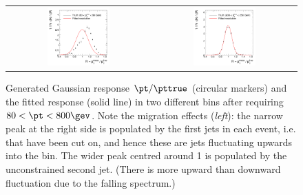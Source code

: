 \begin{figure}[ht]
  \centering
  \begin{tabular}{cc}
    \includegraphics[width=0.45\textwidth]{figures/resFit_ToyMC_PtCuts_ResolutionBin1} &
    \includegraphics[width=0.45\textwidth]{figures/resFit_ToyMC_PtCuts_ResolutionBin7} \\
  \end{tabular}
  \caption{Generated Gaussian response \mbox{$\pt / \pttrue$}
    (circular markers) and the fitted
    response (solid line) in two different \pttrue bins after
    requiring \mbox{$80 < \pt < 800\gev$}.
    Note the migration effects (\textit{left}): the narrow peak at the
    right side is populated by the first jets in each event, i.e. that have been cut on, and hence these are jets fluctuating upwards into the \pt bin.
    The wider peak centred around 1 is populated by the unconstrained
    second jet.
    (There is more upward than downward fluctuation due to the falling
    \pttrue spectrum.)
  }
  \label{fig:ResFit:App:ToyMC:PtCuts:Response}
\end{figure}


